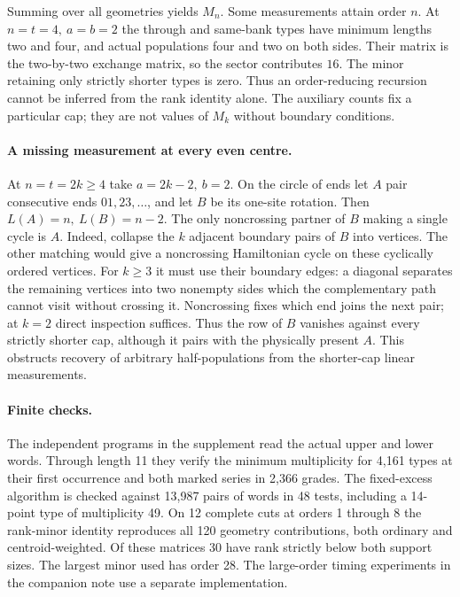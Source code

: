 \documentclass[11pt]{article}
\begin{document}
Summing over all geometries yields \(M_n\). Some measurements attain order \(n\). At \(n=t=4,\ a=b=2\) the through and same-bank types have minimum lengths two and four, and actual populations four and two on both sides. Their matrix is the two-by-two exchange matrix, so the sector contributes \(16\). The minor retaining only strictly shorter types is zero. Thus an order-reducing recursion cannot be inferred from the rank identity alone. The auxiliary counts fix a particular cap; they are not values of \(M_k\) without boundary conditions.

\paragraph{A missing measurement at every even centre.}
At \(n=t=2k\ge4\) take \(a=2k-2,\ b=2\). On the circle of ends let \(A\) pair consecutive ends \(01,23,\ldots\), and let \(B\) be its one-site rotation. Then \(L(A)=n,\ L(B)=n-2\). The only noncrossing partner of \(B\) making a single cycle is \(A\). Indeed, collapse the \(k\) adjacent boundary pairs of \(B\) into vertices. The other matching would give a noncrossing Hamiltonian cycle on these cyclically ordered vertices. For \(k\ge3\) it must use their boundary edges: a diagonal separates the remaining vertices into two nonempty sides which the complementary path cannot visit without crossing it. Noncrossing fixes which end joins the next pair; at \(k=2\) direct inspection suffices. Thus the row of \(B\) vanishes against every strictly shorter cap, although it pairs with the physically present \(A\). This obstructs recovery of arbitrary half-populations from the shorter-cap linear measurements.

\paragraph{Finite checks.}
The independent programs in the supplement read the actual upper and lower words. Through length 11 they verify the minimum multiplicity for 4,161 types at their first occurrence and both marked series in 2,366 grades. The fixed-excess algorithm is checked against 13,987 pairs of words in 48 tests, including a 14-point type of multiplicity 49. On 12 complete cuts at orders 1 through 8 the rank-minor identity reproduces all 120 geometry contributions, both ordinary and centroid-weighted. Of these matrices 30 have rank strictly below both support sizes. The largest minor used has order 28. The large-order timing experiments in the companion note use a separate implementation.
\end{document}

